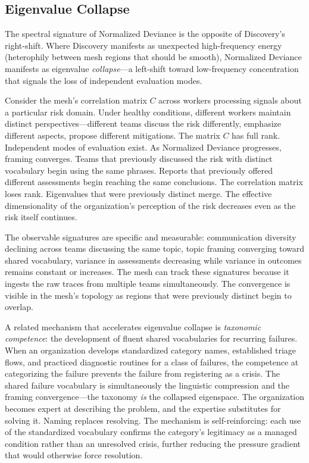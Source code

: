 \documentclass[11pt,a4paper]{article}
\begin{document}
\subsection{Eigenvalue Collapse}
\label{sec:eigenvalue-collapse}

The spectral signature of Normalized Deviance is the opposite of Discovery's right-shift. Where Discovery manifests as unexpected high-frequency energy (heterophily between mesh regions that should be smooth), Normalized Deviance manifests as eigenvalue \emph{collapse}---a left-shift toward low-frequency concentration that signals the loss of independent evaluation modes.

Consider the mesh's correlation matrix $C$ across workers processing signals about a particular risk domain. Under healthy conditions, different workers maintain distinct perspectives---different teams discuss the risk differently, emphasize different aspects, propose different mitigations. The matrix $C$ has full rank. Independent modes of evaluation exist. As Normalized Deviance progresses, framing converges. Teams that previously discussed the risk with distinct vocabulary begin using the same phrases. Reports that previously offered different assessments begin reaching the same conclusions. The correlation matrix loses rank. Eigenvalues that were previously distinct merge. The effective dimensionality of the organization's perception of the risk decreases even as the risk itself continues.

The observable signatures are specific and measurable: communication diversity declining across teams discussing the same topic, topic framing converging toward shared vocabulary, variance in assessments decreasing while variance in outcomes remains constant or increases. The mesh can track these signatures because it ingests the raw traces from multiple teams simultaneously. The convergence is visible in the mesh's topology as regions that were previously distinct begin to overlap.

A related mechanism that accelerates eigenvalue collapse is \emph{taxonomic competence}: the development of fluent shared vocabularies for recurring failures. When an organization develops standardized category names, established triage flows, and practiced diagnostic routines for a class of failures, the competence at categorizing the failure prevents the failure from registering as a crisis. The shared failure vocabulary is simultaneously the linguistic compression and the framing convergence---the taxonomy \emph{is} the collapsed eigenspace. The organization becomes expert at describing the problem, and the expertise substitutes for solving it. Naming replaces resolving. The mechanism is self-reinforcing: each use of the standardized vocabulary confirms the category's legitimacy as a managed condition rather than an unresolved crisis, further reducing the pressure gradient that would otherwise force resolution.
\end{document}
